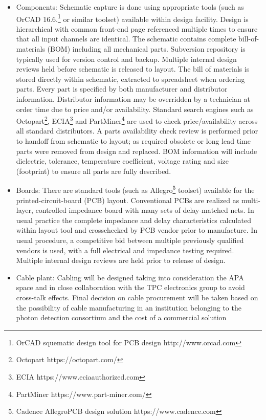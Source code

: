 \begin{itemize}
\item Components: Schematic capture is done using appropriate tools (such as OrCAD 16.6.\footnote{OrCAD\texttrademark{} squematic design tool for PCB design http://www.orcad.com} or similar toolset) available within design facility. Design is hierarchical with common front-end page referenced multiple times to ensure that all input channels are identical. The schematic contains complete bill-of-materials (BOM) including all mechanical parts. Subversion repository is typically used for version control and backup. Multiple internal design reviews held before schematic is released to layout. The bill of materials is stored directly within schematic, extracted to spreadsheet when ordering parts. Every part is specified by both manufacturer and distributor information. Distributor information may be overridden by a technician at order time due to price and/or availability. Standard search engines such as Octopart\footnote{Octopart https://octopart.com/}, ECIA\footnote{ ECIA https://www.eciaauthorized.com} and PartMiner\footnote{PartMiner https://www.part-miner.com/} are used to check price/availability across all standard distributors. A parts availability check review is performed prior to handoff from schematic to layout; as required obsolete or long lead time parts were removed from design and replaced. BOM information will include dielectric, tolerance, temperature coefficient, voltage rating and size (footprint) to ensure all parts are fully described.
\item Boards: There are standard tools (such as Allegro\footnote{Cadence Allegro\textregistered PCB design solution https://www.cadence.com} toolset) available for the printed-circuit-board (PCB) layout. Conventional PCBs are realized as multi-layer, controlled impedance board with many sets of delay-matched nets. In usual practice the complete impedance and delay characteristics calculated within layout tool and crosschecked by PCB vendor prior to manufacture. In usual procedure, a competitive bid between multiple previously qualified vendors is used, with a full electrical and impedance testing required. Multiple internal design reviews are held prior to release of design.
\item Cable plant: Cabling will be designed taking into consideration the APA space and in close collaboration with the TPC electronics group to avoid cross-talk effects. Final decision on cable procurement will be taken based on the possibility of cable manufacturing in an institution belonging to the photon detection consortium and the cost of a commercial solution   

\end{itemize}
